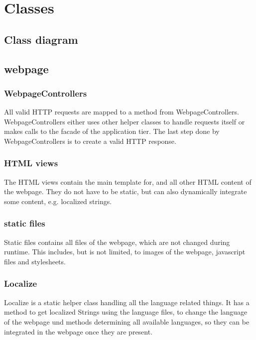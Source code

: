 \section{Classes}

\subsection{Class diagram}

\subsection{webpage} %

\subsubsection*{WebpageControllers}
All valid HTTP requests are mapped to a method from WebpageControllers.
WebpageControllers either uses other helper classes to handle requests itself  
or makes calls to the facade of the application tier. 
The last step done by WebpageControllers is to create a valid HTTP response.
                                                                              

\subsubsection*{HTML views}
The HTML views contain the main template for, and all other HTML content of the webpage. %
They do not have to be static, but can also dynamically integrate some content, e.g. localized strings.

\subsubsection*{static files}
Static files contains all files of the webpage, which are not changed during runtime. 
This includes, but is not limited, to images of the webpage, javascript files and stylesheets.

\subsubsection*{Localize}
Localize is a static helper class handling all the language related things. 
It has a method to get localized Strings using the language files, 
to change the language of the webpage und methods determining all available languages, %
so they can be integrated in the webpage once they are present.

